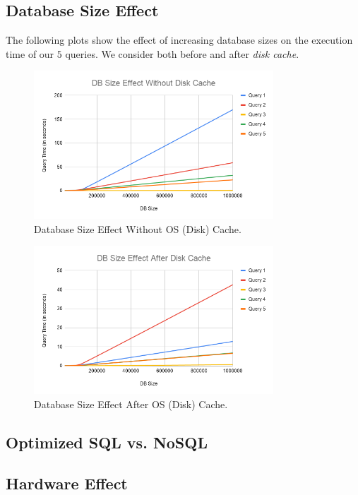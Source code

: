 \subsection{Database Size Effect}
The following plots show the effect of increasing database sizes on the execution time of our $5$ queries. We consider both before and after \emph{disk cache}.

\begin{figure}[H]
    \centering
    \includegraphics[width=0.8\textwidth]{images/db-size-without-cache.png}
    \caption{Database Size Effect Without OS (Disk) Cache.}
    \label{fig:db-size-1}
\end{figure}

\begin{figure}[H]
    \centering
    \includegraphics[width=0.8\textwidth]{images/db-size-after-cache .png}
    \caption{Database Size Effect After OS (Disk) Cache.}
    \label{fig:db-size-2}
\end{figure}

\subsection{Optimized SQL vs. NoSQL}

\subsection{Hardware Effect}
